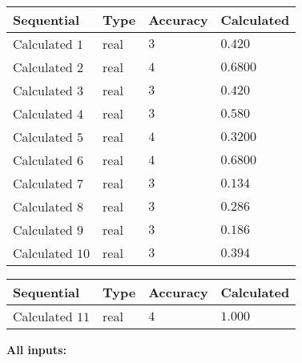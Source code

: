 \documentclass[12pt]{article}
\begin{document}
  
\noindent\begin{tabular}{|l|l|l|l|}
\hline
 Sequential & Type & Accuracy & Calculated \\ 
\hline
 
 
  Calculated $            1 $ & real & $            3  $ & 
 $ 0.420 $ 
 \\  \hline  
 
 
  Calculated $            2 $ & real & $            4  $ & 
 $ 0.6800 $ 
 \\  \hline  
 
 
  Calculated $            3 $ & real & $            3  $ & 
 $ 0.420 $ 
 \\  \hline  
 
 
  Calculated $            4 $ & real & $            3  $ & 
 $ 0.580 $ 
 \\  \hline  
 
 
  Calculated $            5 $ & real & $            4  $ & 
 $ 0.3200 $ 
 \\  \hline  
 
 
  Calculated $            6 $ & real & $            4  $ & 
 $ 0.6800 $ 
 \\  \hline  
 
 
  Calculated $            7 $ & real & $            3  $ & 
 $ 0.134 $ 
 \\  \hline  
 
 
  Calculated $            8 $ & real & $            3  $ & 
 $ 0.286 $ 
 \\  \hline  
 
 
  Calculated $            9 $ & real & $            3  $ & 
 $ 0.186 $ 
 \\  \hline  
 
 
  Calculated $           10 $ & real & $            3  $ & 
 $ 0.394 $ 
 \\  \hline  
 \end{tabular}
   
   
  
  
\noindent\begin{tabular}{|l|l|l|l|}
\hline
 Sequential & Type & Accuracy & Calculated \\ 
\hline
 
 
  Calculated $           11 $ & real & $            4  $ & 
 $ 1.000 $ 
 \\  \hline  
 \end{tabular}
   
   
   
   
\noindent\vspace{0.1in}\hspace{-0.08in} {\textbf{\Large{All inputs: }}}
   
\end{document}
